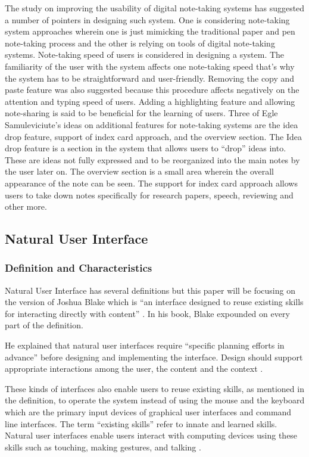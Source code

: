 The study on improving the usability of digital note-taking systems \cite{samulviciute:2009} has suggested a number of pointers in designing such system. One is considering note-taking system approaches wherein one is just mimicking the traditional paper and pen note-taking process and the other is relying on tools of digital note-taking systems. Note-taking speed of users is considered in designing a system. The familiarity of the user with the system affects one note-taking speed that's why the system has to be straightforward and user-friendly. Removing the copy and paste feature was also suggested because this procedure affects negatively on the attention and typing speed of users. Adding a highlighting feature and allowing note-sharing is said to be beneficial for the learning of users. Three of Egle Samuleviciute's ideas on additional features for note-taking systems are the idea drop feature, support of index card approach, and the overview section. The Idea drop feature is a section in the system that allows users to ``drop'' ideas into. These are ideas not fully expressed and to be reorganized into the main notes by the user later on. The overview section is a small area wherein the overall appearance of the note can be seen. The support for index card approach allows users to take down notes specifically for research papers, speech, reviewing and other more.

\subsection{Natural User Interface}
\label{sec:naturaluserinterface}

\subsubsection{Definition and Characteristics}

Natural User Interface has several definitions but this paper will be focusing on the version of Joshua Blake which is ``an interface designed to reuse existing skills for interacting directly with content'' \cite{blake2011natural}. In his book, Blake expounded on every part of the definition.

He explained that natural user interfaces require ``specific planning efforts in advance'' before designing and implementing the interface. Design should support appropriate interactions among the user, the content and the context \cite{blake2011natural}.

These kinds of interfaces also enable users to reuse existing skills, as mentioned in the definition, to operate the system instead of using the mouse and the keyboard which are the primary input devices of graphical user interfaces and command line interfaces. The term ``existing skills'' refer to innate and learned skills. Natural user interfaces enable users interact with computing devices using these skills such as touching, making gestures, and talking \cite{blake2011natural}.


